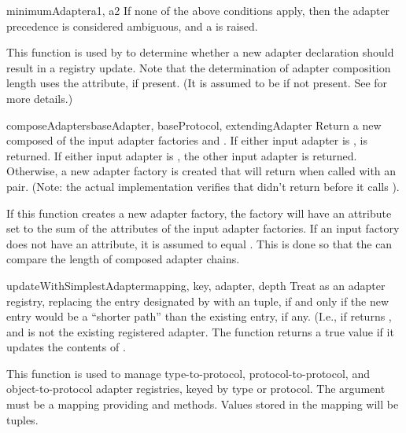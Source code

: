 \begin{verbatim%
}
\begin{verbatim%
}
\begin{verbatim%
}
\begin{verbatim%
}
\begin{verbatim%
}
\begin{verbatim%
}
\begin{funcdesc}{minimumAdapter}{a1, a2 }
If none of the above conditions apply, then the adapter precedence is
considered ambiguous, and a  is raised.

This function is used by  to determine
whether a new adapter declaration should result in a registry update.  Note
that the determination of adapter composition length uses the
 attribute, if present.  (It is assumed to be
 if not present.  See  for more
details.)
\end{funcdesc}


\begin{funcdesc}{composeAdapters}{baseAdapter, baseProtocol, extendingAdapter}
Return a new  composed of the input adapter factories
 and .  If either input adapter is
,  is returned.  If
either input adapter is , the other input adapter
is returned.  Otherwise, a new adapter factory is created that will return
when called with an  pair.  (Note: the actual
implementation verifies that  didn't return 
before it calls ).

If this function creates a new adapter factory, the factory will have an
 attribute set to the sum of the
 attributes of the input adapter factories.  If an
input factory does not have an  attribute, it is
assumed to equal .  This is done so that the
 can compare the length of composed adapter chains.
\end{funcdesc}


\begin{funcdesc}{updateWithSimplestAdapter}{mapping, key, adapter, depth}
Treat  as an adapter registry, replacing the entry designated by
 with an  tuple, if and only if
the new entry would be a ``shorter path'' than the existing entry, if any.
(I.e., if 
returns , and  is not the existing registered
adapter.  The function returns a true value if it updates the contents of
.

This function is used to manage type-to-protocol, protocol-to-protocol, and
object-to-protocol adapter registries, keyed by type or protocol.  The
 argument must be a mapping providing 
and  methods.  Values stored in the mapping will be
 tuples.
\end{funcdesc}







\end{verbatim%
}
\end{verbatim%
}
\end{verbatim%
}
\end{verbatim%
}
\end{verbatim%
}
\end{verbatim%
}
